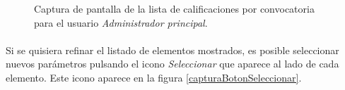   \begin{figure}[!ht]
    \begin{center}
      \caption{Captura de pantalla de la lista de calificaciones por convocatoria para el usuario \textit{Administrador principal}.}
      \label{capturaPantallaListaCalificacionesAdminPrincipal}
    \end{center}
  \end{figure}

  \paragraph{}Si se quisiera refinar el listado de elementos mostrados, es
  posible seleccionar nuevos parámetros pulsando el icono \textit{Seleccionar}
  que aparece al lado de cada elemento. Este icono aparece en la figura
  \ref{capturaBotonSeleccionar}.
